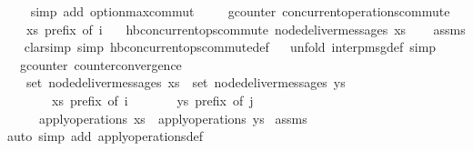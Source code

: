 \begin{isabellebody}
\ \ \isamarkupfalse%
\ {\isacharparenleft}simp\ add{\isacharcolon}\ option{\isacharunderscore}max{\isacharunderscore}commut{\isacharparenright}\isanewline
\ \ \isamarkupfalse%
%
\endisatagproof
{\isafoldproof}%
%
\isadelimproof
\isanewline
%
\endisadelimproof
\isanewline
{}\isamarkupfalse%
\ {\isacharparenleft}\ gcounter{\isacharparenright}\ concurrent{\isacharunderscore}operations{\isacharunderscore}commute{\isacharcolon}\isanewline
\ \ \ {\isachardoublequoteopen}xs\ prefix\ of\ i{\isachardoublequoteclose}\isanewline
\ \ \ {\isachardoublequoteopen}hb{\isachardot}concurrent{\isacharunderscore}ops{\isacharunderscore}commute\ {\isacharparenleft}node{\isacharunderscore}deliver{\isacharunderscore}messages\ xs{\isacharparenright}{\isachardoublequoteclose}\isanewline
%
\isadelimproof
\ \ %
\endisadelimproof
%
\isatagproof
{}\isamarkupfalse%
\ assms\isanewline
\ \ \isamarkupfalse%
{\isacharparenleft}clarsimp\ simp{\isacharcolon}\ hb{\isachardot}concurrent{\isacharunderscore}ops{\isacharunderscore}commute{\isacharunderscore}def{\isacharparenright}\isanewline
\ \ \isamarkupfalse%
{\isacharparenleft}unfold\ interp{\isacharunderscore}msg{\isacharunderscore}def{\isacharcomma}\ simp{\isacharparenright}\isanewline
\ \ \isamarkupfalse%
%
\endisatagproof
{\isafoldproof}%
%
\isadelimproof
\isanewline
%
\endisadelimproof
\isanewline
{}\isamarkupfalse%
\ {\isacharparenleft}\ gcounter{\isacharparenright}\ counter{\isacharunderscore}convergence{\isacharcolon}\isanewline
\ \ \ {\isachardoublequoteopen}set\ {\isacharparenleft}node{\isacharunderscore}deliver{\isacharunderscore}messages\ xs{\isacharparenright}\ {\isacharequal}\ set\ {\isacharparenleft}node{\isacharunderscore}deliver{\isacharunderscore}messages\ ys{\isacharparenright}{\isachardoublequoteclose}\isanewline
\ \ \ \ \ \ \ {\isachardoublequoteopen}xs\ prefix\ of\ i{\isachardoublequoteclose}\isanewline
\ \ \ \ \ \ \ {\isachardoublequoteopen}ys\ prefix\ of\ j{\isachardoublequoteclose}\isanewline
\ \ \ \ \ {\isachardoublequoteopen}apply{\isacharunderscore}operations\ xs\ {\isacharequal}\ apply{\isacharunderscore}operations\ ys{\isachardoublequoteclose}\isanewline
%
\isadelimproof
%
\endisadelimproof
%
\isatagproof
{}\isamarkupfalse%
\ assms\ \isamarkupfalse%
{\isacharparenleft}auto\ simp\ add{\isacharcolon}\ apply{\isacharunderscore}operations{\isacharunderscore}def\isanewline

\end{isabellebody}
